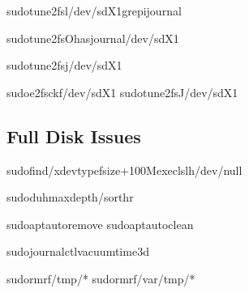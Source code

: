 \documentclass[letterpaper,10pt,english]{sphinxmanual}
\begin{document}
\begin{sphinxVerbatim}[commandchars=\\\{\}]
sudotune2fs\PYGZhy{}l/dev/sdX1grep\PYGZhy{}ijournal

sudotune2fs\PYGZhy{}O\PYGZca{}has\PYGZus{}journal/dev/sdX1

sudotune2fs\PYGZhy{}j/dev/sdX1

sudoe2fsck\PYGZhy{}f/dev/sdX1
sudotune2fs\PYGZhy{}J/dev/sdX1
\end{sphinxVerbatim}


\subsection{Full Disk Issues}
\label{\detokenize{troubleshooting:full-disk-issues}}
\sphinxAtStartPar
{}

\begin{sphinxVerbatim}[commandchars=\\\{\}]
sudofind/\PYGZhy{}xdev\PYGZhy{}typef\PYGZhy{}size+100M\PYGZhy{}execls\PYGZhy{}lh\PYGZgt{}/dev/null

sudodu\PYGZhy{}h\PYGZhy{}\PYGZhy{}max\PYGZhy{}depth/sort\PYGZhy{}hr

sudoaptautoremove
sudoaptautoclean

sudojournalctl\PYGZhy{}\PYGZhy{}vacuum\PYGZhy{}time3d

sudorm\PYGZhy{}rf/tmp/*
sudorm\PYGZhy{}rf/var/tmp/*
\end{sphinxVerbatim}
\end{document}
